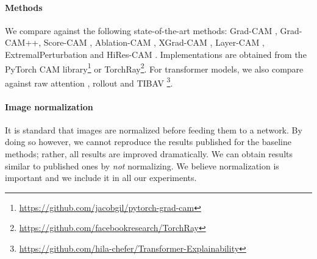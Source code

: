 \paragraph{Methods}

We compare against the following state-of-the-art methods: Grad-CAM \autocite{selvaraju2017grad}, 
Grad-CAM++\cite{chattopadhay2018grad}, Score-CAM \autocite{wang2020score}, Ablation-CAM 
\autocite{ramaswamy2020ablation}, XGrad-CAM \autocite{axiombased}, Layer-CAM 
\autocite{jiang2021layercam}, ExtremalPerturbation \autocite{fong2019understanding} 
and HiRes-CAM \autocite{draelos2020use}. Implementations are obtained from the PyTorch CAM 
library\footnote{\url{https://github.com/jacobgil/pytorch-grad-cam}} or 
TorchRay\footnote{\url{https://github.com/facebookresearch/TorchRay}}. For transformer models, 
we also compare against raw attention \autocite{dosovitskiy2020image}, 
rollout \autocite{abnar2020quantifying} and TIBAV \cite{chefer2021transformer}\footnote{\url{
https://github.com/hila-chefer/Transformer-Explainability}}.

\paragraph{Image normalization}

It is standard that images are normalized before feeding them to a network. By doing so however, 
we cannot reproduce the results published for the baseline methods; rather, all results are 
improved dramatically. We can obtain results similar to published ones by \emph{not} normalizing. 
We believe normalization is important and we include it in all our experiments. 